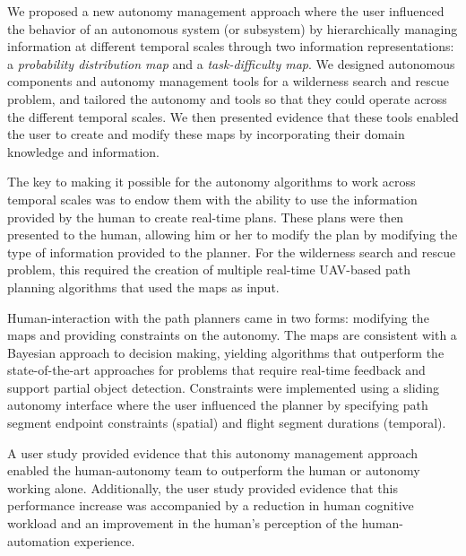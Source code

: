 We proposed a new autonomy management approach where the user influenced the behavior of an autonomous system (or subsystem) by hierarchically managing information at different temporal scales through two information representations:  a \textit{probability distribution map} and a \textit{task-difficulty map}. We designed autonomous components and autonomy management tools for a wilderness search and rescue problem, and tailored the autonomy and tools so that they could operate across the different temporal scales.  We then presented evidence that these tools enabled the user to create and modify these maps by incorporating their domain knowledge and information. 

The key to making it possible for the autonomy algorithms to work across temporal scales was to endow them with the ability to use the information provided by the human to create real-time plans.  These plans were then presented to the human, allowing him or her to modify the plan by modifying the type of information provided to the planner.  For the wilderness search and rescue problem, this required the creation of multiple real-time UAV-based path planning algorithms that used the maps as input.  

Human-interaction with the path planners came in two forms: modifying the maps and providing constraints on the autonomy. The maps are consistent with a Bayesian approach to decision making, yielding algorithms that outperform the state-of-the-art approaches for problems that require real-time feedback and support partial object detection.  Constraints were implemented using a sliding autonomy interface where the user influenced the planner by specifying path segment endpoint constraints (spatial) and flight segment durations (temporal).

A user study provided evidence that this autonomy management approach enabled the human-autonomy team to outperform the human or autonomy working alone.  Additionally, the user study provided evidence that this performance increase was accompanied by a reduction in human cognitive workload and an improvement in the human's perception of the human-automation experience.

